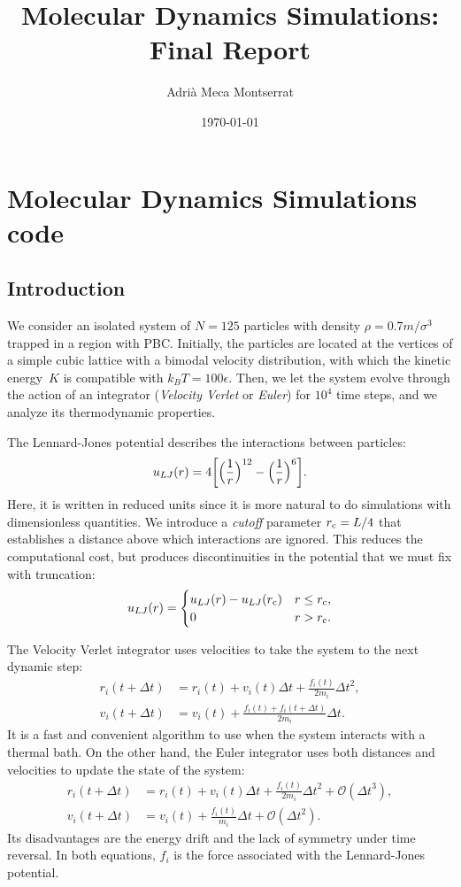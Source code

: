\documentclass{article}
\title{Molecular Dynamics Simulations: Final Report}
\author{Adrià Meca Montserrat}
\date{\today}
\begin{document}
  \maketitle

  \section{Molecular Dynamics Simulations code}

  \subsection{Introduction}

  We consider an isolated system of \(N=125\) particles with density \(\rho=0.7m/\sigma^{3}\) trapped in a region with PBC. Initially, the particles are located at the vertices of a simple cubic lattice with a bimodal velocity distribution, with which the kinetic energy~\(K\) is compatible with \(k_{B}T=100\epsilon\). Then, we let the system evolve through the action of an integrator ({\em Velocity Verlet} or \emph{Euler}) for \(10^{4}\) time steps, and we analyze its thermodynamic properties.

  The Lennard-Jones potential describes the interactions between particles:
  \[
    u_{LJ}(r)=4\biggl[\Bigl(\frac{1}{r}\Bigr)^{12}-\Bigl(\frac{1}{r}\Bigr)^{6}\biggr].
  \]
  Here, it is written in reduced units since it is more natural to do simulations with dimensionless quantities. We introduce a \emph{cutoff} parameter \(r_{\text{c}}=L/4\) that establishes a distance above which interactions are ignored. This reduces the computational cost, but produces discontinuities in the potential that we must fix with truncation:
  \[
    u_{LJ}(r)=%
    \begin{cases}
      u_{LJ}(r)-u_{LJ}(\coff)&r\le \coff,\\0&r>\coff.
    \end{cases}
  \]

  The Velocity Verlet integrator uses velocities to take the system to the next dynamic step:
  \begin{align*}
    r_{i}(t+\Delta t)&=r_{i}(t)+v_{i}(t)\Delta t+\frac{f_{i}(t)}{2m_{i}}{\Delta t}^{2},\\
    v_{i}(t+\Delta t)&=v_{i}(t)+\frac{f_{i}(t)+f_{i}(t+\Delta t)}{2m_{i}}\Delta t.%
  \end{align*}
  It is a fast and convenient algorithm to use when the system interacts with a thermal bath. On the other hand, the Euler integrator uses both distances and velocities to update the state of the system:
  \begin{align*}
    r_{i}(t+\Delta t)&=r_{i}(t)+v_{i}(t)\Delta t+\frac{f_{i}(t)}{2m_{i}}{\Delta t}^{2}+\mathcal{O}({\Delta t}^{3}),\\
    v_{i}(t+\Delta t)&=v_{i}(t)+\frac{f_{i}(t)}{m_{i}}\Delta t+\mathcal{O}({\Delta t}^{2}).%
  \end{align*}
  Its disadvantages are the energy drift and the lack of symmetry under time reversal. In both equations, \(f_{i}\) is the force associated with the Lennard-Jones potential.
\end{document}
